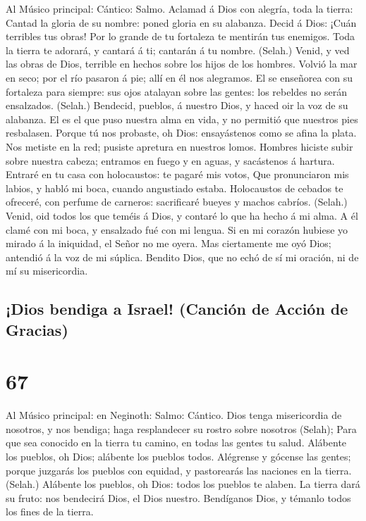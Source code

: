  Al Músico principal: Cántico: Salmo. Aclamad á Dios con
alegría, toda la tierra:  Cantad la gloria de su nombre:
poned gloria en su alabanza.  Decid á Dios: ¡Cuán
terribles tus obras! Por lo grande de tu fortaleza te mentirán tus
enemigos.  Toda la tierra te adorará, y cantará á ti;
cantarán á tu nombre. (Selah.)  Venid, y ved las obras de
Dios, terrible en hechos sobre los hijos de los hombres. 
Volvió la mar en seco; por el río pasaron á pie; allí en él nos
alegramos.  El se enseñorea con su fortaleza para siempre:
sus ojos atalayan sobre las gentes: los rebeldes no serán ensalzados.
(Selah.)  Bendecid, pueblos, á nuestro Dios, y haced oir
la voz de su alabanza.  El es el que puso nuestra alma en
vida, y no permitió que nuestros pies resbalasen.  Porque
tú nos probaste, oh Dios: ensayástenos como se afina la plata.
 Nos metiste en la red; pusiste apretura en nuestros
lomos.  Hombres hiciste subir sobre nuestra cabeza;
entramos en fuego y en aguas, y sacástenos á hartura. 
Entraré en tu casa con holocaustos: te pagaré mis votos, 
Que pronunciaron mis labios, y habló mi boca, cuando angustiado estaba.
 Holocaustos de cebados te ofreceré, con perfume de
carneros: sacrificaré bueyes y machos cabríos. (Selah.) 
Venid, oid todos los que teméis á Dios, y contaré lo que ha hecho á mi
alma.  A él clamé con mi boca, y ensalzado fué con mi
lengua.  Si en mi corazón hubiese yo mirado á la
iniquidad, el Señor no me oyera.  Mas ciertamente me oyó
Dios; antendió á la voz de mi súplica.  Bendito Dios, que
no echó de sí mi oración, ni de mí su misericordia.

\hypertarget{dios-bendiga-a-israel-canciuxf3n-de-acciuxf3n-de-gracias}{%
\subsection{¡Dios bendiga a Israel! (Canción de Acción de
Gracias)}\label{dios-bendiga-a-israel-canciuxf3n-de-acciuxf3n-de-gracias}}

\hypertarget{section-66}{%
\section{67}\label{section-66}}

 Al Músico principal: en Neginoth: Salmo: Cántico. Dios
tenga misericordia de nosotros, y nos bendiga; haga resplandecer su
rostro sobre nosotros (Selah);  Para que sea conocido en
la tierra tu camino, en todas las gentes tu salud. 
Alábente los pueblos, oh Dios; alábente los pueblos todos.
 Alégrense y gócense las gentes; porque juzgarás los
pueblos con equidad, y pastorearás las naciones en la tierra. (Selah.)
 Alábente los pueblos, oh Dios: todos los pueblos te
alaben.  La tierra dará su fruto: nos bendecirá Dios, el
Dios nuestro.  Bendíganos Dios, y témanlo todos los fines
de la tierra.

